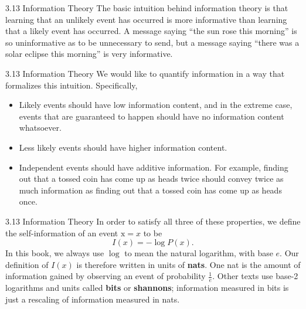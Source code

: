 \begin{frame}{3.13 Information Theory}
    \justifying
    The basic intuition behind information theory is that learning that an unlikely event has occurred is more informative than learning that a likely event has occurred. A message saying ``the sun rose this morning'' is so uninformative as to be unnecessary to send, but a message saying ``there was a solar eclipse this morning'' is very informative.
\end{frame}

\begin{frame}{3.13 Information Theory}
    \justifying
    We would like to quantify information in a way that formalizes this intuition. Specifically,
    \begin{itemize}
        \justifying
        \item Likely events should have low information content, and in the extreme case, events that are guaranteed to happen should have no information content whatsoever.
        \item Less likely events should have higher information content.
        \item Independent events should have additive information. For example, finding out that a tossed coin has come up as heads twice should convey twice as much information as finding out that a tossed coin has come up as heads once.   
    \end{itemize}
\end{frame}

\begin{frame}{3.13 Information Theory}
    \justifying
    In order to satisfy all three of these properties, we define the self-information of an event $\mathrm{x} = x$ to be
    \begin{equation}
        I(x) = -\log{P(x)}.
        \label{eq:3_48}
    \end{equation}
    In this book, we always use $\log$ to mean the natural logarithm, with base $e$. Our definition of $I(x)$ is therefore written in units of \textbf{nats}. One nat is the amount of information gained by observing an event of probability $\frac{1}{e}$. Other texts use base-2 logarithms and units called \textbf{bits} or \textbf{shannons}; information measured in bits is just a rescaling of information measured in nats.
\end{frame}

